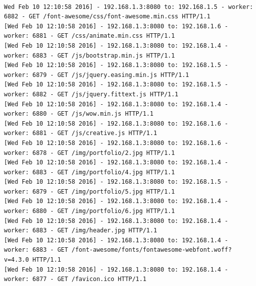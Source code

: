 \documentclass[italian]{tktltiki2}
\begin{document}
\begin{lstlisting}[basicstyle=\fontsize{4}{7}\selectfont\ttfamily]

Wed Feb 10 12:10:58 2016] - 192.168.1.3:8080 to: 192.168.1.5 - worker: 6882 - GET /font-awesome/css/font-awesome.min.css HTTP/1.1
[Wed Feb 10 12:10:58 2016] - 192.168.1.3:8080 to: 192.168.1.6 - worker: 6881 - GET /css/animate.min.css HTTP/1.1
[Wed Feb 10 12:10:58 2016] - 192.168.1.3:8080 to: 192.168.1.4 - worker: 6883 - GET /js/bootstrap.min.js HTTP/1.1
[Wed Feb 10 12:10:58 2016] - 192.168.1.3:8080 to: 192.168.1.5 - worker: 6879 - GET /js/jquery.easing.min.js HTTP/1.1
[Wed Feb 10 12:10:58 2016] - 192.168.1.3:8080 to: 192.168.1.5 - worker: 6882 - GET /js/jquery.fittext.js HTTP/1.1
[Wed Feb 10 12:10:58 2016] - 192.168.1.3:8080 to: 192.168.1.4 - worker: 6880 - GET /js/wow.min.js HTTP/1.1
[Wed Feb 10 12:10:58 2016] - 192.168.1.3:8080 to: 192.168.1.6 - worker: 6881 - GET /js/creative.js HTTP/1.1
[Wed Feb 10 12:10:58 2016] - 192.168.1.3:8080 to: 192.168.1.6 - worker: 6878 - GET /img/portfolio/2.jpg HTTP/1.1
[Wed Feb 10 12:10:58 2016] - 192.168.1.3:8080 to: 192.168.1.4 - worker: 6883 - GET /img/portfolio/4.jpg HTTP/1.1
[Wed Feb 10 12:10:58 2016] - 192.168.1.3:8080 to: 192.168.1.5 - worker: 6879 - GET /img/portfolio/5.jpg HTTP/1.1
[Wed Feb 10 12:10:58 2016] - 192.168.1.3:8080 to: 192.168.1.4 - worker: 6880 - GET /img/portfolio/6.jpg HTTP/1.1
[Wed Feb 10 12:10:58 2016] - 192.168.1.3:8080 to: 192.168.1.4 - worker: 6883 - GET /img/header.jpg HTTP/1.1
[Wed Feb 10 12:10:58 2016] - 192.168.1.3:8080 to: 192.168.1.4 - worker: 6883 - GET /font-awesome/fonts/fontawesome-webfont.woff?v=4.3.0 HTTP/1.1
[Wed Feb 10 12:10:58 2016] - 192.168.1.3:8080 to: 192.168.1.4 - worker: 6877 - GET /favicon.ico HTTP/1.1

\end{lstlisting}

\newpage
\end{document}
